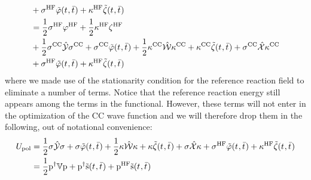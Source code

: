\begin{equation}
\begin{aligned}
&+ \sigma^\mathrm{HF}\tilde{\varphi}(t_{},\bar{t}_{}) + \kappa^\mathrm{HF}\tilde{\zeta}(t_{},\bar{t}_{}) \\
&=
    \frac{1}{2}\sigma^\mathrm{HF}\varphi^\mathrm{HF}
  + \frac{1}{2}\kappa^\mathrm{HF}\zeta^\mathrm{HF} \\
&+  \frac{1}{2}\sigma^\mathrm{CC}\hat{\mathcal{Y}}\sigma^\mathrm{CC}
  + \sigma^\mathrm{CC}\tilde{\varphi}(t_{},\bar{t}_{})
  + \frac{1}{2}\kappa^\mathrm{CC}\hat{\mathcal{W}}\kappa^\mathrm{CC}
  + \kappa^\mathrm{CC}\tilde{\zeta}(t_{},\bar{t}_{})
  + \sigma^\mathrm{CC}\hat{\mathcal{X}}\kappa^\mathrm{CC} \\
&+ \sigma^\mathrm{HF}\tilde{\varphi}(t_{},\bar{t}_{}) + \kappa^\mathrm{HF}\tilde{\zeta}(t_{},\bar{t}_{})
  \end{aligned}
\end{equation}
where we made use of the stationarity condition for the reference
reaction field to eliminate a number of terms. Notice that the
reference reaction energy still appears among the terms in the
functional. However, these terms will not enter in the optimization of
the \acs{CC} wave function and we will therefore drop them in the
following, out of notational convenience:
\begin{equation}
  \begin{aligned}
  U_\mathrm{pol} &=
    \frac{1}{2}\sigma\hat{\mathcal{Y}}\sigma
    + \sigma\tilde{\varphi}(t_{},\bar{t}_{})
  + \frac{1}{2}\kappa\hat{\mathcal{W}}\kappa
  + \kappa\tilde{\zeta}(t_{},\bar{t}_{})
  + \sigma\hat{\mathcal{X}}\kappa
  + \sigma^\mathrm{HF}\tilde{\varphi}(t_{},\bar{t}_{}) +
  \kappa^\mathrm{HF}\tilde{\zeta}(t_{},\bar{t}_{}) \\
  &= \frac{1}{2}\mathrm{p}^\dagger\mathbb{V}\mathrm{p} + \mathrm{p}^\dagger\tilde{\mathrm{s}}(t_{},\bar{t}_{})
  + \mathrm{p}^\mathrm{HF}\tilde{\mathrm{s}}(t_{},\bar{t}_{})
\end{aligned}
\end{equation}

